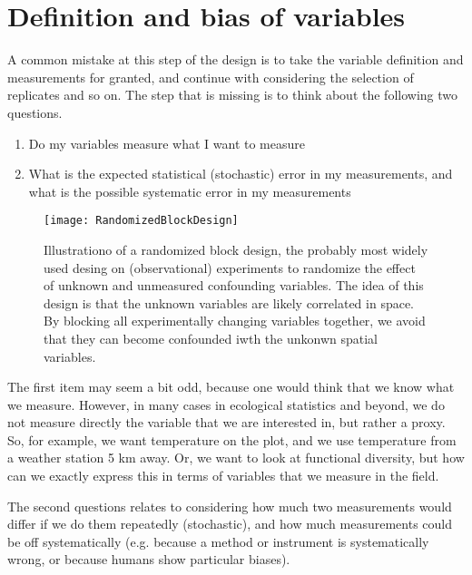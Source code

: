 \documentclass[a4paper,twoside]{tufte-book}\usepackage[]{graphicx}\usepackage[]{color}
\begin{document}
{\section{Definition and bias of variables}

A common mistake at this step of the design is to take the variable definition and measurements for granted, and continue with considering the selection of replicates and so on. The step that is missing is to think about the following two questions. 

\begin{enumerate}
  \item Do my variables measure what I want to measure
  \item What is the expected statistical (stochastic) error in my measurements, and what is the possible systematic error in my measurements
\end{enumerate}

\begin{figure}[]
\begin{center}
\texttt{[image: RandomizedBlockDesign]}
\caption{Illustrationo of a randomized block design, the probably most widely used desing on (observational) experiments to randomize the effect of unknown and unmeasured confounding variables. The idea of this design is that the unknown variables are likely correlated in space. By blocking all experimentally changing variables together, we avoid that they can become confounded iwth the unkonwn spatial variables.}
\label{fig: RandomizedBlockDesign}
\end{center}
\end{figure}


The first item may seem a bit odd, because one would think that we know what we measure. However, in many cases in ecological statistics and beyond, we do not measure directly the variable that we are interested in, but rather a proxy. So, for example, we want temperature on the plot, and we use temperature from a weather station 5 km away. Or, we want to look at functional diversity, but how can we exactly express this in terms of variables that we measure in the field.

The second questions relates to considering how much two measurements would differ if we do them repeatedly (stochastic), and how much measurements could be off systematically (e.g. because a method or instrument is systematically wrong, or because humans show particular biases).


}
\end{document}
